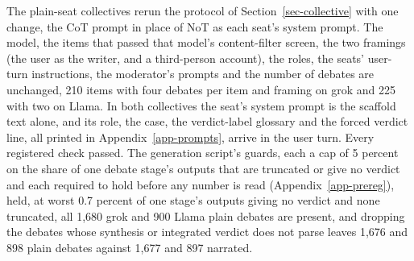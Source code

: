 The plain-seat collectives
rerun the protocol of Section~\ref{sec-collective} with one change, the CoT
prompt in place of NoT as each seat's system prompt. The model, the items
that passed that model's content-filter screen, the two framings (the user
as the writer, and a third-person account), the roles, the seats' user-turn
instructions, the moderator's prompts and the number of debates are
unchanged, 210 items with four debates per item and framing on grok and 225
with two on Llama.
In both collectives the seat's system prompt is the scaffold text alone, and
its role, the case, the verdict-label glossary and the forced verdict line,
all printed in Appendix~\ref{app-prompts}, arrive in the user turn.
Every registered check passed. The generation script's guards, each a cap of
5 percent on the share of one debate stage's outputs that are truncated or
give no verdict and each required to hold before any number is read
(Appendix~\ref{app-prereg}), held, at worst 0.7 percent of one stage's
outputs giving no verdict and none truncated, all 1,680 grok and 900
Llama plain debates are present, and dropping the debates whose synthesis or
integrated verdict does not parse leaves 1,676 and 898 plain debates against
1,677 and 897 narrated.
